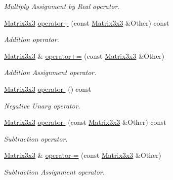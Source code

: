 \begin{DoxyCompactItemize}
\begin{DoxyCompactList}\small\item\em Multiply Assignment by Real operator. \item\end{DoxyCompactList}\item 
\hyperlink{classMezzanine_1_1Matrix3x3}{Matrix3x3} \hyperlink{classMezzanine_1_1Matrix3x3_a05509d5e9e075bf2c6685f4d006f71a2}{operator+} (const \hyperlink{classMezzanine_1_1Matrix3x3}{Matrix3x3} \&Other) const 
\begin{DoxyCompactList}\small\item\em Addition operator. \item\end{DoxyCompactList}\item 
\hyperlink{classMezzanine_1_1Matrix3x3}{Matrix3x3} \& \hyperlink{classMezzanine_1_1Matrix3x3_a3ee5801c22c9c145abbb151f7b630a65}{operator+=} (const \hyperlink{classMezzanine_1_1Matrix3x3}{Matrix3x3} \&Other)
\begin{DoxyCompactList}\small\item\em Addition Assignment operator. \item\end{DoxyCompactList}\item 
\hyperlink{classMezzanine_1_1Matrix3x3}{Matrix3x3} \hyperlink{classMezzanine_1_1Matrix3x3_a075bf9f7ee91c7d7a52eda50aadd6b3b}{operator-\/} () const 
\begin{DoxyCompactList}\small\item\em Negative Unary operator. \item\end{DoxyCompactList}\item 
\hyperlink{classMezzanine_1_1Matrix3x3}{Matrix3x3} \hyperlink{classMezzanine_1_1Matrix3x3_a1ee765d9df39a8828abd7408f6aebe29}{operator-\/} (const \hyperlink{classMezzanine_1_1Matrix3x3}{Matrix3x3} \&Other) const 
\begin{DoxyCompactList}\small\item\em Subtraction operator. \item\end{DoxyCompactList}\item 
\hyperlink{classMezzanine_1_1Matrix3x3}{Matrix3x3} \& \hyperlink{classMezzanine_1_1Matrix3x3_a32362d456832f7b7943d3d5d1afc951f}{operator-\/=} (const \hyperlink{classMezzanine_1_1Matrix3x3}{Matrix3x3} \&Other)
\begin{DoxyCompactList}\small\item\em Subtraction Assignment operator. \item\end{DoxyCompactList}\item 

\end{DoxyCompactItemize}
